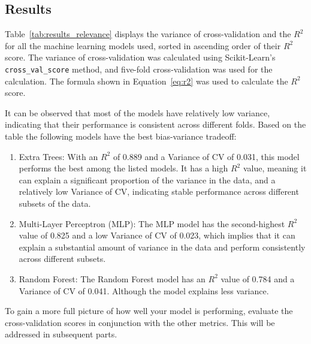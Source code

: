 \subsection{Results}\label{subsec:results3}

Table~\ref*{tab:results_relevance} displays the variance of cross-validation and the $R^2$ for all the machine
learning models used, sorted in ascending order of their $R^2$ score. The variance of cross-validation was calculated
using Scikit-Learn's \texttt{cross\_val\_score} method, and five-fold cross-validation was used for the calculation.
The formula shown in Equation~\ref{eq:r2} was used to calculate the $R^2$ score.

It can be observed that most of the models have relatively low variance, indicating that their performance is
consistent across different folds.
Based on the table the following models have the best bias-variance tradeoff:

\begin{enumerate}
    \item Extra Trees: With an $R^2$ of 0.889 and a Variance of CV of 0.031, this model performs the best among
    the listed models. It has a high $R^2$ value, meaning it can explain a significant proportion of the
    variance in the data, and a relatively low Variance of CV, indicating stable performance across different
    subsets of the data.
    \item Multi-Layer Perceptron (MLP): The MLP model has the second-highest $R^2$ value of 0.825 and a low Variance
    of CV
    of 0.023, which implies that it can explain a substantial amount of variance in the data and perform
    consistently across different subsets.
    \item Random Forest: The Random Forest model has an $R^2$ value of 0.784 and a Variance of CV of 0.041.
    Although the model explains less variance.
\end{enumerate}


To gain a more full picture of how well your model is performing, evaluate the cross-validation scores in conjunction
with the other metrics. This will be addressed in subsequent parts.


